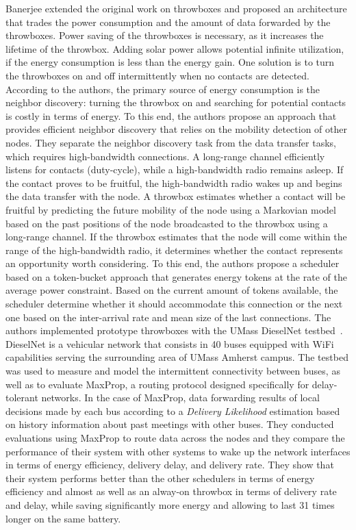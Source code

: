 Banerjee \etal extended the original work on throwboxes and proposed an architecture that trades the power consumption and the amount of data forwarded by the throwboxes. Power saving of the throwboxes is necessary, as it increases the lifetime of the throwbox. Adding solar power allows potential infinite utilization, if the energy consumption is less than the energy gain. One solution is to turn the throwboxes on and off intermittently when no contacts are detected. According to the authors, the primary source of energy consumption is the neighbor discovery: turning the throwbox on and searching for potential contacts is costly in terms of energy. To this end, the authors propose an approach that provides efficient neighbor discovery that relies on the mobility detection of other nodes. They separate the neighbor discovery task from the data transfer tasks, which requires high-bandwidth connections. A long-range channel efficiently listens for contacts (duty-cycle), while a high-bandwidth radio remains asleep. If the contact proves to be fruitful, the high-bandwidth radio wakes up and begins the data transfer with the node. A throwbox estimates whether a contact will be fruitful by predicting the future mobility of the node using a Markovian model based on the past positions of the node broadcasted to the throwbox using a long-range channel. If the throwbox estimates that the node will come within the range of the high-bandwidth radio, it determines whether the contact represents an opportunity worth considering. To this end, the authors propose a scheduler based on a token-bucket approach that generates energy tokens at the rate of the average power constraint. Based on the current amount of tokens available, the scheduler determine whether it should accommodate this connection or the next one based on the inter-arrival rate and mean size of the last connections. The authors implemented prototype throwboxes with the UMass DieselNet testbed~\cite{burgess2006maxprop}. DieselNet is a vehicular network that consists in 40 buses equipped with WiFi capabilities serving the surrounding area of UMass Amherst campus. The testbed was used to measure and model the intermittent connectivity between buses, as well as to evaluate MaxProp, a routing protocol designed specifically for delay-tolerant networks. In the case of MaxProp, data forwarding results of local decisions made by each bus according to a \textit{Delivery Likelihood} estimation based on history information about past meetings with other buses. They conducted evaluations using MaxProp to route data across the nodes and they compare the performance of their system with other systems to wake up the network interfaces in terms of energy efficiency, delivery delay, and delivery rate. They show that their system performs better than the other schedulers in terms of energy efficiency and almost as well as an alway-on throwbox in terms of delivery rate and delay, while saving significantly more energy and allowing to last 31 times longer on the same battery.

